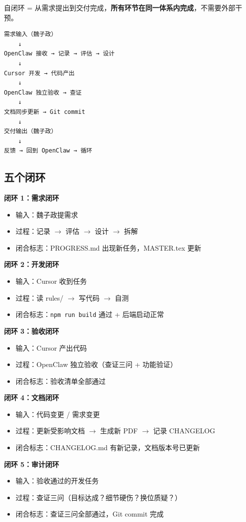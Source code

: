 \documentclass[11pt,a4paper]{article}
\begin{document}
自闭环 = 从需求提出到交付完成，\textbf{所有环节在同一体系内完成}，不需要外部干预。

\begin{verbatim}
需求输入（魏子政）
    ↓
OpenClaw 接收 → 记录 → 评估 → 设计
    ↓
Cursor 开发 → 代码产出
    ↓
OpenClaw 独立验收 → 查证
    ↓
文档同步更新 → Git commit
    ↓
交付输出（魏子政）
    ↓
反馈 → 回到 OpenClaw → 循环
\end{verbatim}

\subsection{五个闭环}

\textbf{闭环 1：需求闭环}
\begin{itemize}[nosep]
  \item 输入：魏子政提需求
  \item 过程：记录 $\to$ 评估 $\to$ 设计 $\to$ 拆解
  \item 闭合标志：PROGRESS.md 出现新任务，MASTER.tex 更新
\end{itemize}

\textbf{闭环 2：开发闭环}
\begin{itemize}[nosep]
  \item 输入：Cursor 收到任务
  \item 过程：读 rules/ $\to$ 写代码 $\to$ 自测
  \item 闭合标志：\texttt{npm run build} 通过 + 后端启动正常
\end{itemize}

\textbf{闭环 3：验收闭环}
\begin{itemize}[nosep]
  \item 输入：Cursor 产出代码
  \item 过程：OpenClaw 独立验收（查证三问 + 功能验证）
  \item 闭合标志：验收清单全部通过
\end{itemize}

\textbf{闭环 4：文档闭环}
\begin{itemize}[nosep]
  \item 输入：代码变更 / 需求变更
  \item 过程：更新受影响文档 $\to$ 生成新 PDF $\to$ 记录 CHANGELOG
  \item 闭合标志：CHANGELOG.md 有新记录，文档版本号已更新
\end{itemize}

\textbf{闭环 5：审计闭环}
\begin{itemize}[nosep]
  \item 输入：验收通过的开发任务
  \item 过程：查证三问（目标达成？细节硬伤？换位质疑？）
  \item 闭合标志：查证三问全部通过，Git commit 完成
\end{itemize}
\end{document}
